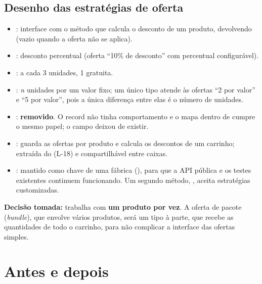 \subsection{Desenho das estrat\'egias de oferta}
\begin{itemize}
\item {}: interface com o m\'etodo que calcula o desconto de um produto, devolvendo  (vazio quando a oferta n\~ao se aplica).
\item {}: desconto percentual (oferta ``10\% de desconto'' com percentual configur\'avel).
\item {}: a cada 3 unidades, 1 gratuita.
\item {}: \textit{n} unidades por um valor fixo; um \'unico tipo atende \`as ofertas ``2 por valor'' e ``5 por valor'', pois a \'unica diferen\c{c}a entre elas \'e o n\'umero de unidades.
\item {}: \textbf{removido}. O record n\~ao tinha comportamento e o mapa  dentro de  cumpre o mesmo papel; o campo  deixou de existir.
\item {}: guarda as ofertas por produto e calcula os descontos de um carrinho; extra\'ida do  (L-18) e compartilh\'avel entre caixas.
\item {}: mantido como chave de uma f\'abrica (), para que a API p\'ublica  e os testes existentes continuem funcionando. Um segundo m\'etodo, , aceita estrat\'egias customizadas.
\end{itemize}
\textbf{Decis\~ao tomada:}  trabalha com \textbf{um produto por vez}. A oferta de pacote (\textit{bundle}), que envolve v\'arios produtos, ser\'a um tipo \`a parte, que recebe as quantidades de todo o carrinho, para n\~ao complicar a interface das ofertas simples.

\section{Antes e depois}
